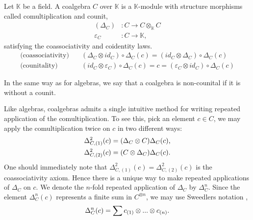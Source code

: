 \documentclass[../thesis.tex]{subfiles}
\begin{document}
            \begin{definition}
                Let $\mathbb{K}$ be a field. A coalgebra $C$ over $\mathbb{K}$ is a $\mathbb{K}$-module with structure morphisms called comultiplication and counit,
                \begin{align*}
                    (\Delta_C) & : C \rightarrow C\otimes_{\mathbb{K}}C \\
                    \varepsilon_C & : C \rightarrow \mathbb{K},
                \end{align*}
                satisfying the coassociativity and coidentity laws. 
                \begin{align*}
                    \text{(coassociativity)} \quad & (\Delta_C\otimes id_C)\circ\Delta_C(c) = (id_C\otimes\Delta_C)\circ\Delta_C(c) \\
                    \text{(counitality)} \quad & (id_C\otimes\varepsilon_C)\circ\Delta_C(c) = c = (\varepsilon_C\otimes id_C)\circ\Delta_C(c)
                \end{align*}
            \end{definition}

            In the same way as for algebras, we say that a coalgebra is non-counital if it is without a counit.

            Like algebras, coalgebras admits a single intuitive method for writing repeated application of the comultiplication. To see this, pick an element $c\in C$, we may apply the comultiplication twice on $c$ in two different ways:
            \begin{align*}
                \Delta_{C,(1)}^2(c) & = (\Delta_C \otimes C)\Delta_C(c)\tt{,} \\
                \Delta_{C,(2)}^2(c) & = (C \otimes \Delta_C)\Delta_C(c)\tt{.}
            \end{align*}
            One should immediately note that $\Delta_{C,(1)}^2(c) = \Delta_{C,(2)}^2(c)$ is the coassociativity axiom. Hence there is a unique way to make repeated applications of $\Delta_C$ on $c$. We denote the $n$-fold repeated application of $\Delta_C$ by $\Delta_C^n$. Since the element $\Delta_C^n(c)$ represents a finite sum in $C^{\otimes n}$, we may use Sweedlers notation \cite{Loday12},
            \begin{align*}
                \Delta_C^n(c) = \sum c_{(1)}\otimes ... \otimes c_{(n)}\tt{.}
            \end{align*}
            
                    
\end{document}
